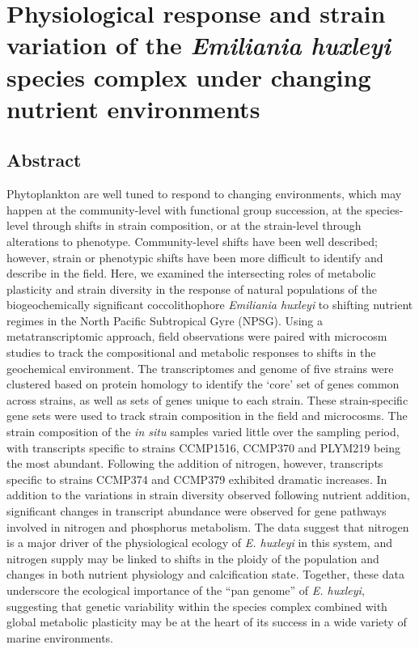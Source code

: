 

\chapter{Physiological response and strain variation of the \textsl{Emiliania huxleyi} species complex under changing nutrient environments}
\label{chap:5}
\raggedbottom

{\let\thefootnote\relax{}}


\clearpage

\section{Abstract} 
Phytoplankton are well tuned to respond to changing environments, which may happen at the community-level with functional group succession, at the species-level through shifts in strain composition, or at the strain-level through alterations to phenotype. Community-level shifts have been well described; however, strain or phenotypic shifts have been more difficult to identify and describe in the field. Here, we examined the intersecting roles of metabolic plasticity and strain diversity in the response of natural populations of the biogeochemically significant coccolithophore \textit{Emiliania huxleyi} to shifting nutrient regimes in the North Pacific Subtropical Gyre (NPSG). Using a metatranscriptomic approach, field observations were paired with microcosm studies to track the compositional and metabolic responses to shifts in the geochemical environment. The transcriptomes and genome of five strains were clustered based on protein homology to identify the `core' set of genes common across strains, as well as sets of genes unique to each strain. These strain-specific gene sets were used to track strain composition in the field and microcosms. The strain composition of the \textit{in situ} samples varied little over the sampling period, with transcripts specific to strains CCMP1516, CCMP370 and PLYM219 being the most abundant.  Following the addition of nitrogen, however, transcripts specific to strains CCMP374 and CCMP379 exhibited dramatic increases. In addition to the variations in strain diversity observed following nutrient addition, significant changes in transcript abundance were observed for gene pathways involved in nitrogen and phosphorus metabolism.  The data suggest that nitrogen is a major driver of the physiological ecology of \textit{E. huxleyi} in this system, and nitrogen supply may be linked to shifts in the ploidy of the population and changes in both nutrient physiology and calcification state. Together, these data underscore the ecological importance of the ``pan genome'' of \textit{E. huxleyi}, suggesting that genetic variability within the species complex combined with global metabolic plasticity may be at the heart of its success in a wide variety of marine environments. \par

